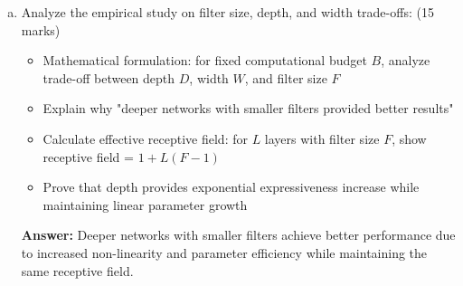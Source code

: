 \documentclass[12pt]{article}
\newcommand{\answer}[1]{{\color{answercolor}\textbf{Answer:} #1}}
\begin{document}
\begin{enumerate}[(a)]
    \item Analyze the empirical study on filter size, depth, and width trade-offs: \hfill (15 marks)
    \begin{itemize}
        \item Mathematical formulation: for fixed computational budget $B$, analyze trade-off between depth $D$, width $W$, and filter size $F$
        \item Explain why "deeper networks with smaller filters provided better results"
        \item Calculate effective receptive field: for $L$ layers with filter size $F$, show receptive field = $1 + L(F-1)$
        \item Prove that depth provides exponential expressiveness increase while maintaining linear parameter growth
    \end{itemize}

    \begin{center}
    \end{center}
    
    \answer{Deeper networks with smaller filters achieve better performance due to increased non-linearity and parameter efficiency while maintaining the same receptive field.}
    

\end{enumerate}
\end{document}
